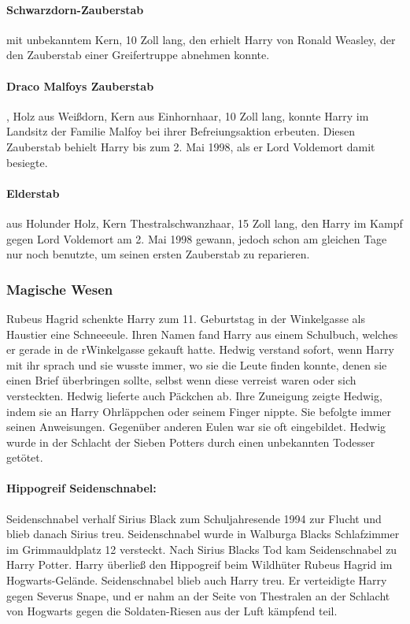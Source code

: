 \documentclass[a4paper, 10pt]{article}
\begin{document}
\paragraph{Schwarzdorn-Zauberstab}
mit unbekanntem Kern, 10 Zoll lang, den erhielt Harry von Ronald Weasley, der den Zauberstab einer Greifertruppe abnehmen konnte.
\paragraph{Draco Malfoys Zauberstab}
, Holz aus Weißdorn, Kern aus Einhornhaar, 10 Zoll lang, konnte Harry im Landsitz der Familie Malfoy bei ihrer Befreiungsaktion erbeuten. Diesen Zauberstab behielt Harry bis zum 2. Mai 1998, als er Lord Voldemort damit besiegte.
\paragraph{Elderstab}
aus Holunder Holz, Kern Thestralschwanzhaar, 15 Zoll lang, den Harry im Kampf gegen Lord Voldemort am 2. Mai 1998 gewann, jedoch schon am gleichen Tage nur noch benutzte, um seinen ersten Zauberstab zu reparieren.

\subsubsection*{\large Magische Wesen}
Rubeus Hagrid schenkte Harry zum 11. Geburtstag in der Winkelgasse als Haustier eine Schneeeule. Ihren Namen fand Harry aus einem Schulbuch, welches er gerade in de rWinkelgasse gekauft hatte. Hedwig verstand sofort, wenn Harry mit ihr sprach und sie wusste immer, wo sie die Leute finden konnte, denen sie einen Brief überbringen sollte, selbst wenn diese verreist waren oder sich versteckten. Hedwig lieferte auch Päckchen ab. Ihre Zuneigung zeigte Hedwig, indem sie an Harry Ohrläppchen oder seinem Finger nippte. Sie befolgte immer seinen Anweisungen. Gegenüber anderen Eulen war sie oft eingebildet. Hedwig wurde in der Schlacht der Sieben Potters durch einen unbekannten Todesser getötet.

\paragraph{Hippogreif Seidenschnabel:}
Seidenschnabel verhalf Sirius Black zum Schuljahresende 1994 zur Flucht und blieb danach Sirius treu. Seidenschnabel wurde in Walburga Blacks Schlafzimmer im Grimmauldplatz 12 versteckt. Nach Sirius Blacks Tod kam Seidenschnabel zu Harry Potter. Harry überließ den Hippogreif beim Wildhüter Rubeus Hagrid im Hogwarts-Gelände. Seidenschnabel blieb auch Harry treu. Er verteidigte Harry gegen Severus Snape, und er nahm an der Seite von Thestralen an der Schlacht von Hogwarts gegen die Soldaten-Riesen aus der Luft kämpfend teil.
\end{document}
